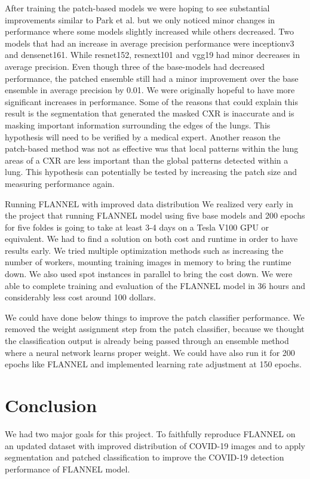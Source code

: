 \documentclass{sigkddExp}
\begin{document}
After training the patch-based models we were hoping to see substantial
improvements similar to Park et al. but we only noticed minor changes in
performance where some models slightly increased while others decreased. Two
models that had an increase in average precision performance were inceptionv3
and densenet161. While resnet152, resnext101 and vgg19 had minor decreases in
average precision. Even though three of the base-models had decreased
performance, the patched ensemble still had a minor improvement over the base
ensemble in average precision by 0.01. We were originally hopeful to have more
significant increases in performance. Some of the reasons that could explain
this result is the segmentation that generated the masked CXR is inaccurate and
is masking important information surrounding the edges of the lungs. This
hypothesis will need to be verified by a medical expert. Another reason the
patch-based method was not as effective was that local patterns within the lung
areas of a CXR are less important than the global patterns detected within a
lung. This hypothesis can potentially be tested by increasing the patch size and
measuring performance again.

Running FLANNEL with improved data distribution We realized very early in the
project that running FLANNEL model using five base models and 200 epochs for
five foldes is going to take at least 3-4 days on a Tesla V100 GPU or
equivalent. We had to find a solution on both cost and runtime in order to have
results early. We tried multiple optimization methods such as increasing the
number of workers, mounting training images in memory to bring the runtime down.
We also used spot instances in parallel to bring the cost down. We were able to
complete training and evaluation of the FLANNEL model in 36 hours and
considerably less cost around 100 dollars.

We could have done below things to improve the patch classifier performance. We
removed the weight assignment step from the patch classifier, because we thought
the classification output is already being passed through an ensemble method
where a neural network learns proper weight. We could have also run it for 200
epochs like FLANNEL and implemented learning rate adjustment at 150 epochs.



\section{Conclusion}
We had two major goals for this project. To faithfully reproduce FLANNEL on an
updated dataset with improved distribution of COVID-19 images and to apply
segmentation and patched classification to improve the COVID-19 detection
performance of FLANNEL model. 
\end{document}
